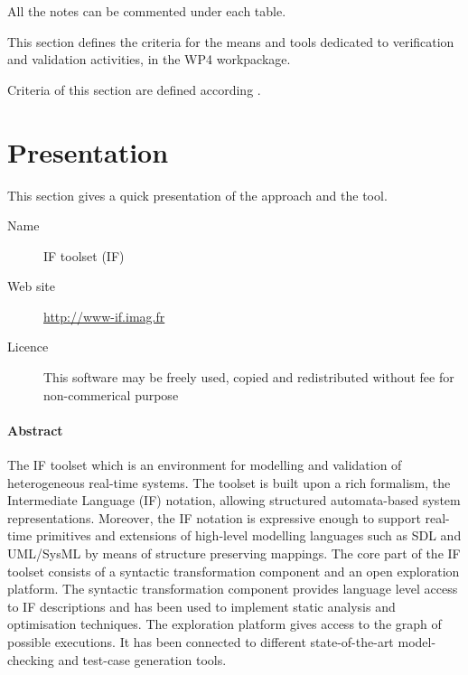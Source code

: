 All the notes can be commented under each table.

This section defines the criteria for the means and tools dedicated to verification and validation activities, in the WP4 workpackage. 

Criteria of this section are defined according \citep{D4.1}.

\section{Presentation}

This section gives a quick presentation of the approach and the tool.

\begin{description}
\item[Name]  IF toolset (IF)
\item[Web site]  \url{http://www-if.imag.fr}
\item[Licence]  This software may be freely used, copied and redistributed without fee for non-commerical purpose
\end{description}

\paragraph{Abstract}  


The IF toolset which is an environment for modelling and validation of heterogeneous real-time systems. The toolset is built upon a rich formalism, the Intermediate Language  (IF) notation, allowing structured automata-based system representations. Moreover, the IF notation is expressive enough to support real-time primitives and extensions of high-level modelling languages such as SDL and UML/SysML by means of structure preserving mappings. The core part of the IF toolset consists of a syntactic transformation component and an open exploration platform. The syntactic transformation component provides language level access to IF descriptions and has been used to implement static analysis and optimisation techniques. The exploration platform gives access to the graph of possible executions. It has been connected to different state-of-the-art model-checking and test-case generation tools.

